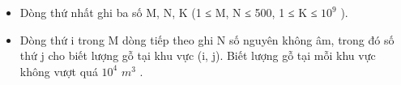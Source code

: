 \begin{itemize}
	\item Dòng thứ nhất ghi ba số M, N, K (1 ≤ M, N ≤ 500, 1 ≤ K ≤ $10^{9}$ ).
	\item Dòng thứ i trong M dòng tiếp theo ghi N số nguyên không âm, trong đó số thứ j cho biết lượng gỗ tại khu vực (i, j). Biết lượng gỗ tại mỗi khu vực không vượt quá $10^{4}$ $m^{3}$ .
\end{itemize}